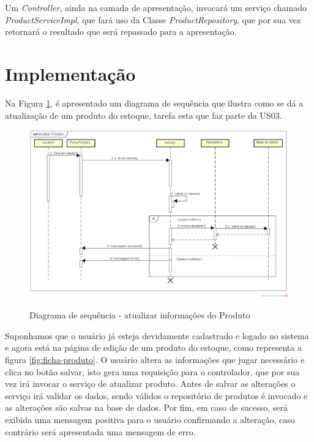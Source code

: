 \documentclass[a4paper,12pt]{monografia}
\begin{document}
Um \textit{Controller}, ainda na camada de apresentação, invocará um serviço chamado \textit{ProductServiceImpl}, que fará uso da Classe \textit{ProductRepository}, que por sua vez retornará o resultado que será repassado para a apresentação.


\section{Implementação} %
\label{sec:implementacao}

Na Figura \ref{fig:sd-atualiza}, é apresentado um diagrama de sequência que ilustra como se dá a atualização de um produto do estoque, tarefa esta que faz parte da US03.

\begin{figure}[H]
\centering
\caption{Diagrama de sequência - atualizar informações do Produto}
\centering
\includegraphics[width=16cm]{img/diagramas/sd-atualiza-produto.eps}\\
\label{fig:sd-atualiza}
\end{figure}

Suponhamos que o usuário já esteja devidamente cadastrado e logado no sistema e agora está na página de edição de um produto do estoque, como representa a figura \ref{fig:ficha-produto}. O usuário altera as informações que jugar necessário e clica no botão salvar, isto gera uma requisição para o controlador, que por sua vez irá invocar o serviço de atualizar produto. Antes de salvar as alterações o serviço irá validar os dados, sendo válidos o repositório de produtos é invocado e as alterações são salvas na base de dados. Por fim,  em caso de sucesso, será exibida uma mensagem positiva para o usuário confirmando a alteração, caso contrário será apresentada uma mensagem de erro.
\end{document}
